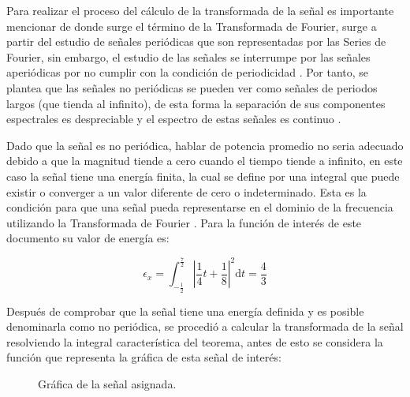 \documentclass[11pt,letterpaper,twocolumn]{article}
\begin{document}
    Para realizar el proceso del cálculo de la transformada de la señal es importante mencionar
    de donde surge el término de la Transformada de Fourier, surge a partir del estudio de señales
    periódicas que son representadas por las Series de Fourier, sin embargo, el estudio de las 
    señales se interrumpe por las señales aperiódicas por no cumplir con la condición de periodicidad
    \cite{Sauchelli2020}. Por tanto, se plantea que las señales no periódicas se pueden ver como 
    señales de periodos largos (que tienda al infinito), de esta forma la separación de sus 
    componentes espectrales es despreciable y el espectro de estas señales es continuo \cite{Silva2021}.
    
    Dado que la señal es no periódica, hablar de potencia promedio no seria adecuado debido a que 
    la magnitud tiende a cero cuando el tiempo tiende a infinito, en este caso la señal tiene una
    energía finita, la cual se define por una integral que puede existir o converger a un valor
    diferente de cero o indeterminado. Esta es la condición para que una señal pueda representarse
    en el dominio de la frecuencia utilizando la Transformada de Fourier \cite{Fabian}. Para la función de interés
    de este documento su valor de energía es:
    
    \begin{equation*}
        \epsilon_x=\int_{-\frac{1}{2}}^{\frac{7}{2}}\left|\frac{1}{4}t + \frac{1}{8}\right|^2 \mathrm{d}t = \frac{4}{3}
    \end{equation*}

    Después de comprobar que la señal tiene una energía definida y es posible denominarla como no
    periódica, se procedió a calcular la transformada de la señal resolviendo la integral 
    característica del teorema, antes de esto se considera la función que representa la gráfica
    de esta señal de interés:

    \begin{figure}[H]
        \centering
        \caption{Gráfica de la señal asignada.}
        \label{funcionAsiganda}
    \end{figure}
\end{document}
